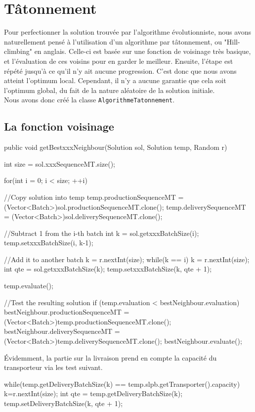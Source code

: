\section{Tâtonnement}
Pour perfectionner la solution trouvée par l'algorithme évolutionniste, nous avons naturellement pensé à l'utilisation d'un algorithme par tâtonnement, ou "Hill-climbing" en anglais. Celle-ci est basée sur une fonction de voisinage très basique, et l'évaluation de ces voisins pour en garder le meilleur. Ensuite, l'étape est répété jusqu'à ce qu'il n'y ait aucune progression. C'est donc que nous avons atteint l'optimum local. Cependant, il n'y a aucune garantie que cela soit l'optimum global, du fait de la nature aléatoire de la solution initiale.\\
Nous avons donc créé la classe \verb!AlgorithmeTatonnement!.
\subsection{La fonction voisinage}

\begin{java}
public void getBestxxxNeighbour(Solution sol, Solution temp, Random r) {
	int size = sol.xxxSequenceMT.size();		
	
	for(int i = 0; i < size; ++i) {
		//Copy solution into temp
		temp.productionSequenceMT = (Vector<Batch>)sol.productionSequenceMT.clone();
		temp.deliverySequenceMT = (Vector<Batch>)sol.deliverySequenceMT.clone();
		
		//Subtract 1 from the i-th batch
		int k = sol.getxxxBatchSize(i);
		temp.setxxxBatchSize(i, k-1);
		
		//Add it to another batch
		k = r.nextInt(size);
		while(k == i)
			k = r.nextInt(size);
		int qte = sol.getxxxBatchSize(k);
		temp.setxxxBatchSize(k, qte + 1);
		
		temp.evaluate();
		
		//Test the resulting solution
		if (temp.evaluation < bestNeighbour.evaluation) {
			bestNeighbour.productionSequenceMT = (Vector<Batch>)temp.productionSequenceMT.clone();
			bestNeighbour.deliverySequenceMT = (Vector<Batch>)temp.deliverySequenceMT.clone();
			bestNeighbour.evaluate();
		}
	}
}
\end{java}

\vspace{1em}

Évidemment, la partie sur la livraison prend en compte la capacité du transporteur via les test suivant.

\begin{java}
while(temp.getDeliveryBatchSize(k) == temp.slpb.getTransporter().capacity) {
	k=r.nextInt(size);
}
int qte = temp.getDeliveryBatchSize(k);
temp.setDeliveryBatchSize(k, qte + 1);
\end{java}

